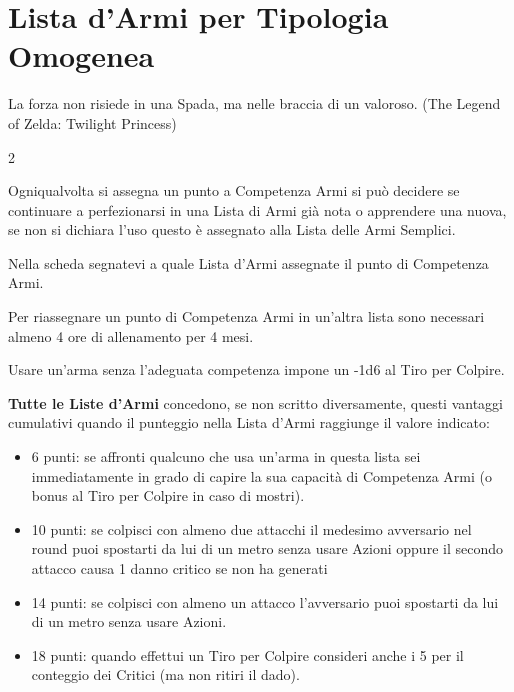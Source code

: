 \section{Lista d'Armi per Tipologia Omogenea}\hypertarget{lista.armi}{}\label{lista.armi}

\begin{enfasi}{La forza non risiede in una Spada, ma nelle braccia di un valoroso. (The Legend of Zelda: Twilight Princess)} \end{enfasi}

\begin{multicols}{2}

Ogniqualvolta si assegna un punto a Competenza Armi si può decidere se continuare a perfezionarsi in una Lista di Armi già nota o apprendere una nuova, se non si dichiara l'uso questo è assegnato alla Lista delle Armi Semplici.

Nella scheda segnatevi a quale Lista d'Armi assegnate il punto di Competenza Armi.

Per riassegnare un punto di Competenza Armi in un'altra lista sono necessari almeno 4 ore di allenamento per 4 mesi.

Usare un'arma senza l'adeguata competenza impone un -1d6 al Tiro per Colpire.

\textbf{Tutte le Liste d'Armi} concedono, se non scritto diversamente, questi vantaggi cumulativi quando il punteggio nella Lista d'Armi raggiunge il valore indicato:

\begin{itemize}[leftmargin=*] \setlength{\itemsep}{0pt}

\item 6 punti: se affronti qualcuno che usa un'arma in questa lista sei immediatamente in grado di capire la sua capacità di Competenza Armi (o bonus al Tiro per Colpire in caso di mostri).

\item 10 punti: se colpisci con almeno due attacchi il medesimo avversario nel round puoi spostarti da lui di un metro senza usare Azioni oppure il secondo attacco causa 1 danno critico se non ha generati

\item 14 punti: se colpisci con almeno un attacco l'avversario puoi spostarti da lui di un metro senza usare Azioni.

\item 18 punti: quando effettui un Tiro per Colpire consideri anche i 5 per il conteggio dei Critici (ma non ritiri il dado).


\end{itemize}
\end{multicols}
